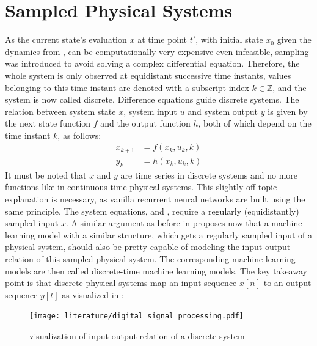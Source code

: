 \documentclass[draft,final]{vutinfth} %
\begin{document}
    \section{Sampled Physical Systems} \label{sampled_physical_systems}
    As the current state's evaluation $x$ at time point $t'$, with initial state $x_0$ given the dynamics from , can be computationally very expensive even infeasible, sampling was introduced to avoid solving a complex differential equation.
    Therefore, the whole system is only observed at equidistant successive time instants, values belonging to this time instant are denoted with a subscript index $k \in \mathbb{Z}$, and the system is now called discrete.
    Difference equations guide discrete systems. The relation between system state $x$, system input $u$ and system output $y$ is given by the next state function $f$ and the output function $h$, both of which depend on the time instant $k$, as follows:
    \begin{align}
        \label{discrete_system_equations_state}
        x_{k+1} &= f(x_k,u_k,k) \\
        \label{discrete_system_equations_output}
        y_k &= h(x_k,u_k,k)
    \end{align}
    It must be noted that $x$ and $y$ are time series in discrete systems and no more functions like in continuous-time physical systems.
    This slightly off-topic explanation is necessary, as vanilla recurrent neural networks are built using the same principle.
    The system equations,  and , require a regularly (equidistantly) sampled input $x$.
    A similar argument as before in  proposes now that a machine learning model with a similar structure, which gets a regularly sampled input of a physical system, should also be pretty capable of modeling the input-output relation of this sampled physical system.
    The corresponding machine learning models are then called discrete-time machine learning models.
    The key takeaway point is that discrete physical systems map an input sequence $x[n]$ to an output sequence $y[t]$ as visualized in \cite[p. 102]{dsp}:
    \begin{figure}[H]
        \centering{}
        \texttt{[image: literature/digital\_signal\_processing.pdf]}
        \caption{visualization of input-output relation of a discrete system}
        \label{fig:discrete_system_vis}
    \end{figure}
\end{document}

